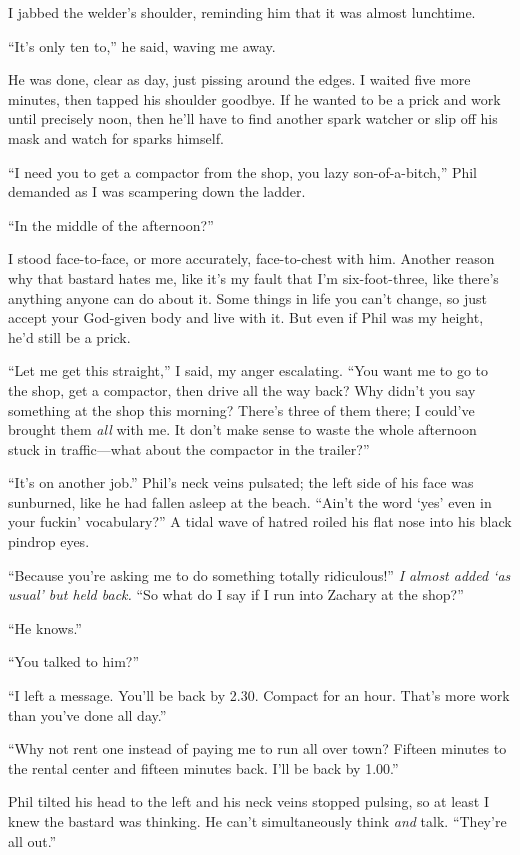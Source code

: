 \titlemark

I jabbed the welder's shoulder, reminding him that it was almost
lunchtime.

``It's only ten to,'' he said, waving me away.

He was done, clear as day, just pissing around the edges. I waited five
more minutes, then tapped his shoulder goodbye. If he wanted to be a
prick and work until precisely noon, then he'll have to find another
spark watcher or slip off his mask and watch for sparks himself.

``I need you to get a compactor from the shop, you lazy
son-of-a-bitch,'' Phil demanded as I was scampering down the ladder.

``In the middle of the afternoon?''

I stood face-to-face, or more accurately, face-to-chest with him.
Another reason why that bastard hates me, like it's my fault that I'm
six-foot-three, like there's anything anyone can do about it. Some
things in life you can't change, so just accept your God-given body and
live with it. But even if Phil was my height, he'd still be a prick.

``Let me get this straight,'' I said, my anger escalating. ``You want me
to go to the shop, get a compactor, then drive all the way back? Why
didn't you say something at the shop this morning? There's three of them
there; I could've brought them \emph{all} with me. It don't make sense
to waste the whole afternoon stuck in traffic---what about the compactor
in the trailer?''

``It's on another job.'' Phil's neck veins pulsated; the left side of
his face was sunburned, like he had fallen asleep at the beach. ``Ain't
the word `yes' even in your fuckin' vocabulary?'' A tidal wave of hatred
roiled his flat nose into his black pindrop eyes.

``Because you're asking me to do something totally ridiculous!'' \emph{I
almost added `as usual' but held back.} ``So what do I say if I run into
Zachary at the shop?''

``He knows.''

``You talked to him?''

``I left a message. You'll be back by 2.30. Compact for an hour. That's
more work than you've done all day.''

``Why not rent one instead of paying me to run all over town? Fifteen
minutes to the rental center and fifteen minutes back. I'll be back by
1.00.''

Phil tilted his head to the left and his neck veins stopped pulsing, so
at least I knew the bastard was thinking. He can't simultaneously think
\emph{and} talk. ``They're all out.''


